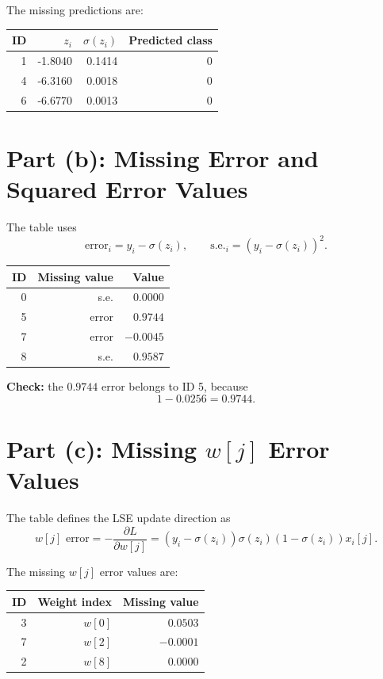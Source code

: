 \documentclass[11pt]{article}
\begin{document}
The missing predictions are:

\begin{center}
\begin{tabular}{rrrr}
\toprule
ID & \(z_i\) & \(\sigma(z_i)\) & Predicted class \\
\midrule
1 & -1.8040 & 0.1414 & 0 \\
4 & -6.3160 & 0.0018 & 0 \\
6 & -6.6770 & 0.0013 & 0 \\
\bottomrule
\end{tabular}
\end{center}

\section*{Part (b): Missing Error and Squared Error Values}

The table uses
\[
    \text{error}_i = y_i-\sigma(z_i),
    \qquad
    \text{s.e.}_i = \left(y_i-\sigma(z_i)\right)^2.
\]

\begin{center}
\begin{tabular}{rrr}
\toprule
ID & Missing value & Value \\
\midrule
0 & s.e. & \(0.0000\) \\
5 & error & \(0.9744\) \\
7 & error & \(-0.0045\) \\
8 & s.e. & \(0.9587\) \\
\bottomrule
\end{tabular}
\end{center}

\textbf{Check:} the \(0.9744\) error belongs to ID 5, because
\[
    1-0.0256=0.9744.
\]

\section*{Part (c): Missing \(w[j]\) Error Values}

The table defines the LSE update direction as
\[
    w[j]\text{ error}
    =
    -\frac{\partial L}{\partial w[j]}
    =
    (y_i-\sigma(z_i))\sigma(z_i)(1-\sigma(z_i))x_i[j].
\]

The missing \(w[j]\) error values are:

\begin{center}
\begin{tabular}{rrr}
\toprule
ID & Weight index & Missing value \\
\midrule
3 & \(w[0]\) & \(0.0503\) \\
7 & \(w[2]\) & \(-0.0001\) \\
2 & \(w[8]\) & \(0.0000\) \\
\bottomrule
\end{tabular}
\end{center}
\end{document}
